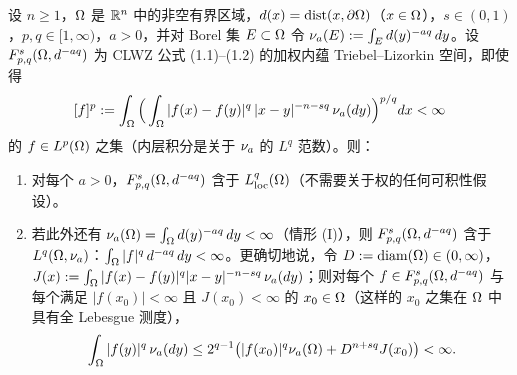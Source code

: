 \begin{lemma}
设 $n\ge1$，$\Omega$ 是 $\mathbb{R}^n$ 中的非空有界区域，$d(x)=\operatorname{dist}(x,\partial\Omega)$（$x\in\Omega$），$s\in(0,1)$，$p,q\in[1,\infty)$，$a>0$，并对 Borel 集 $E\subset\Omega$ 令 $\nu_{a}(E):=\int_E d(y)^{-aq}\,dy$。设 $F^{s}_{p,q}(\Omega,d^{-aq})$ 为 CLWZ 公式 (1.1)--(1.2) 的加权内蕴 Triebel--Lizorkin 空间，即使得
\begin{equation}\label{eq:sec6-f6-seminorm}
  [f]^p:=\int_\Omega\Big(\int_\Omega|f(x)-f(y)|^q\,|x-y|^{-n-sq}\,\nu_{a}(dy)\Big)^{p/q}dx<\infty
\end{equation}
的 $f\in L^p(\Omega)$ 之集（内层积分是关于 $\nu_{a}$ 的 $L^q$ 范数）。则：
\begin{enumerate}[label=(\roman*)]
  \item 对每个 $a>0$，$F^{s}_{p,q}(\Omega,d^{-aq})$ 含于 $L^q_{\mathrm{loc}}(\Omega)$（不需要关于权的任何可积性假设）。
  \item 若此外还有 $\nu_{a}(\Omega)=\int_\Omega d(y)^{-aq}\,dy<\infty$（情形 (I)），则 $F^{s}_{p,q}(\Omega,d^{-aq})$ 含于 $L^q(\Omega,\nu_{a})$：$\int_\Omega|f|^q\,d^{-aq}\,dy<\infty$。更确切地说，令 $D:=\operatorname{diam}(\Omega)\in(0,\infty)$，$J(x):=\int_\Omega|f(x)-f(y)|^q|x-y|^{-n-sq}\,\nu_{a}(dy)$；则对每个 $f\in F^{s}_{p,q}(\Omega,d^{-aq})$ 与每个满足 $|f(x_0)|<\infty$ 且 $J(x_0)<\infty$ 的 $x_0\in\Omega$（这样的 $x_0$ 之集在 $\Omega$ 中具有全 Lebesgue 测度），
  \[
    \int_\Omega|f(y)|^q\,\nu_{a}(dy)\le2^{q-1}\big(|f(x_0)|^q\nu_{a}(\Omega)+D^{n+sq}J(x_0)\big)<\infty .
  \]
\end{enumerate}
\end{lemma}

